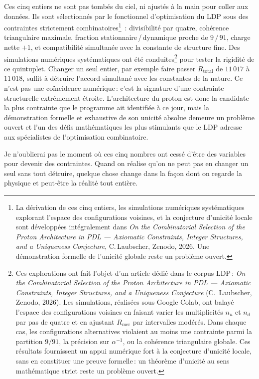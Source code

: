 \documentclass[12pt, a4paper, openright]{book}
\begin{document}
\medskip

Ces cinq entiers ne sont pas tombés du ciel, ni ajustés à la main pour coller aux données. Ils sont sélectionnés par le fonctionnel d'optimisation du LDP sous des contraintes strictement combinatoires\footnote{La dérivation de ces cinq entiers, les simulations numériques systématiques explorant l'espace des configurations voisines, et la conjecture d'unicité locale sont développées intégralement dans \textit{On the Combinatorial Selection of the Proton Architecture in PDL --- Axiomatic Constraints, Integer Structures, and a Uniqueness Conjecture}, C.\,Laubscher, Zenodo, 2026. Une démonstration formelle de l'unicité globale reste un problème ouvert.}~: divisibilité par quatre, cohérence triangulaire maximale, fraction stationnaire\,/\,dynamique proche de $9\,/\,91$, charge nette $+1$, et compatibilité simultanée avec la constante de structure fine. Des simulations numériques systématiques ont été conduites\footnote{Ces explorations ont fait l'objet d'un article dédié dans le corpus LDP\,: \emph{On the Combinatorial Selection of the Proton Architecture in PDL --- Axiomatic Constraints, Integer Structures, and a Uniqueness Conjecture} (C.\ Laubscher, Zenodo, 2026). Les simulations, réalisées sous Google Colab, ont balayé l'espace des configurations voisines en faisant varier les multiplicités $n_u$ et $n_d$ par pas de quatre et en ajustant $R_\text{mer}$ par intervalles modérés. Dans chaque cas, les configurations alternatives violaient au moins une contrainte parmi la partition $9/91$, la précision sur $\alpha^{-1}$, ou la cohérence triangulaire globale. Ces résultats fournissent un appui numérique fort à la conjecture d'unicité locale, sans en constituer une preuve formelle\,: un théorème d'unicité au sens mathématique strict reste un problème ouvert.} pour tester la rigidité de ce quintuplet. Changer un seul entier, par exemple faire passer $R_\text{total}$ de $11\,017$ à $11\,018$, suffit à détruire l'accord simultané avec les constantes de la nature. Ce n'est pas une coïncidence numérique\,: c'est la signature d'une contrainte structurelle extrêmement étroite. L'architecture du proton est donc la candidate la plus contrainte que le programme ait identifiée à ce jour, mais la démonstration formelle et exhaustive de son unicité absolue demeure un problème ouvert et l'un des défis mathématiques les plus stimulants que le LDP adresse aux spécialistes de l'optimisation combinatoire.

\medskip

Je n'oublierai pas le moment où ces cinq nombres ont cessé d'être des variables pour devenir des contraintes. Quand on réalise qu'on ne peut pas en changer un seul sans tout détruire, quelque chose change dans la façon dont on regarde la physique et peut-être la réalité tout entière.
\end{document}
